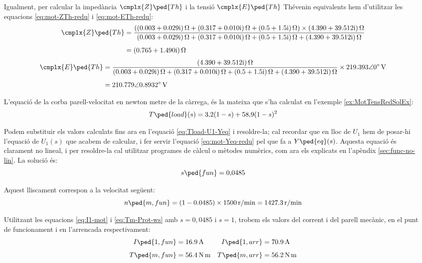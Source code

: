 \begin{exemple}
	Igualment, per calcular  la impedància $\cmplx{Z}\ped{Th}$ i la tensió $\cmplx{E}\ped{Th}$ Thévenin equivalents hem d'utilitzar les equacions \eqref{eq:mot-ZTh-redu} i \eqref{eq:mot-ETh-redu}:
	\begin{align*}
		\cmplx{Z}\ped{Th} &= \frac{(\complexqty{0,003+j0,029}{\ohm} + \complexqty{0,317+j0,010}{\ohm} +  \complexqty{0,5+j1,5}{\ohm})\times\complexqty{4,390+j39,512}{\ohm}}
		{\complexqty{0,003+j0,029}{\ohm} + \complexqty{0,317+j0,010}{\ohm} + \complexqty{0,5+j1,5}{\ohm}+\complexqty{4,390+j39,512}{\ohm}}  \\[1ex]   
		&= \complexqty{0,765+j1,490}{\ohm}
	\end{align*}
	\vspace{-7mm}
	\begin{align*}		
		\cmplx{E}\ped{Th}  &= \frac{\complexqty{4,390+j39,512}{\ohm}}
		{\complexqty{0,003+j0,029}{\ohm} + \complexqty{0,317+j0,010}{\ohm} + \complexqty{0,5+j1,5}{\ohm}+\complexqty{4,390+j39,512}{\ohm}}\times
		\complexqty{219,393:0}{V}  \\[1ex]   
		&=  \complexqty{210,779:0,8932}{V}
	\end{align*}
	
	L'equació de la corba parell-velocitat en newton metre de la càrrega, és la mateixa que s'ha calculat en l'exemple  \ref{ex:MotTensRedSolEx}:
	\[
		T\ped{load}(s) = 3{,}2 (1-s) + 58{,}9 (1-s)^2
	\]
	
	Podem  substituir els  valors calculats fins ara en l'equació \eqref{eq:Tload-U1-Yeq} i resoldre-la; cal recordar que en lloc de $U_1$ hem de posar-hi l'equació de $U_1(s)$ que acabem de calcular, i fer servir l'equació \eqref{eq:mot-Yeq-redu} pel que fa a $Y\ped{eq}(s)$. Aquesta equació és clarament no lineal, i per  resoldre-la cal utilitzar programes de càlcul o mètodes numèrics, com ara els explicats en l'apèndix \ref{sec:func-no-lin}. La solució és:
	\[
		s\ped{fun} = 0{,}0485
	\]
	
	Aquest lliscament correspon a la velocitat següent:
	\[
		n\ped{m,fun}= (1-\num{0,0485})\times \qty{1500}{r/min} = \qty{1427,3}{r/min}
	\]
	
	Utilitzant les equacions \eqref{eq:I1-mot} i \eqref{eq:Tm-Prot-ws} amb $s=0{,}0485$ i $s=1$, trobem els valors del corrent i del parell mecànic, en el punt de funcionament  i en l'arrencada respectivament:
	\begin{align*}
		I\ped{1,fun} &= \qty{16,9}{A} &
		I\ped{1,arr} &= \qty{70,9}{A} \\[1ex] 
		T\ped{m,fun} &=  \qty{56,4}{N.m} & 
		T\ped{m,arr} &=  \qty{56,2}{N.m}
	\end{align*}
	

\end{exemple}
